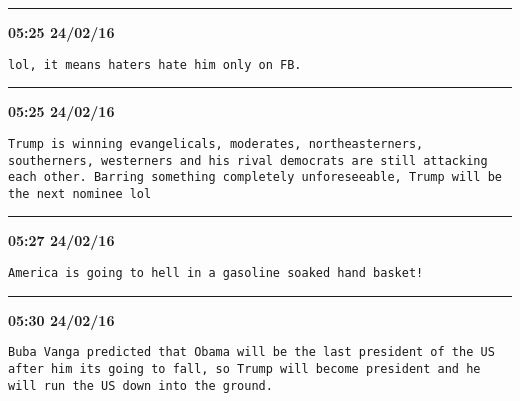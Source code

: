 \hrule%

\begin{adjustwidth}{0cm}{0cm}
\footnotesize \textbf{05:25 24/02/16}

\begin{lstlisting}[breaklines, breakatwhitespace, basicstyle=\small, frame=leftline]
lol, it means haters hate him only on FB.
\end{lstlisting}
\end{adjustwidth}

\hrule%

\begin{adjustwidth}{0cm}{0cm}
\footnotesize \textbf{05:25 24/02/16}

\begin{lstlisting}[breaklines, breakatwhitespace, basicstyle=\small, frame=leftline]
Trump is winning evangelicals, moderates, northeasterners, southerners, westerners and his rival democrats are still attacking each other. Barring something completely unforeseeable, Trump will be the next nominee lol
\end{lstlisting}
\end{adjustwidth}

\hrule%

\begin{adjustwidth}{0cm}{0cm}
\footnotesize \textbf{05:27 24/02/16}

\begin{lstlisting}[breaklines, breakatwhitespace, basicstyle=\small, frame=leftline]
America is going to hell in a gasoline soaked hand basket!
\end{lstlisting}
\end{adjustwidth}

\hrule%

\begin{adjustwidth}{0cm}{0cm}
\footnotesize \textbf{05:30 24/02/16}

\begin{lstlisting}[breaklines, breakatwhitespace, basicstyle=\small, frame=leftline]
Buba Vanga predicted that Obama will be the last president of the US after him its going to fall, so Trump will become president and he will run the US down into the ground.
\end{lstlisting}
\end{adjustwidth}

